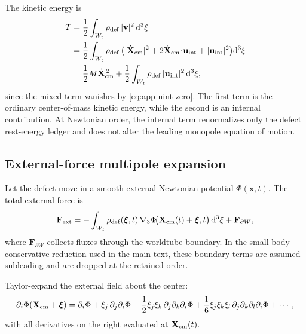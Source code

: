 \documentclass[11pt]{article}
\newcommand{\dd}{\mathrm d}
\newcommand{\x}{\mathbf x}
\newcommand{\vct}{\mathbf v}
\newcommand{\gradThree}{\nabla_3}
\newcommand{\PhiN}{\Phi}
\begin{document}
The kinetic energy is
\begin{align}
T
&=
\frac12\int_{W_t}\rho_{\rm def}\,|\vct|^2\,\dd^3\xi
\nonumber\\
&=
\frac12\int_{W_t}\rho_{\rm def}\,
\bigl(
|\dot{\mathbf X}_{\rm cm}|^2
+
2\dot{\mathbf X}_{\rm cm}\!\cdot\!\mathbf u_{\rm int}
+
|\mathbf u_{\rm int}|^2
\bigr)\dd^3\xi
\nonumber\\
&=
\frac12 M\dot{\mathbf X}_{\rm cm}^{\,2}
+
\frac12\int_{W_t}\rho_{\rm def}\,|\mathbf u_{\rm int}|^2\,\dd^3\xi,
\label{eq:app-kinetic-split}
\end{align}
since the mixed term vanishes by \eqref{eq:app-uint-zero}. The first term is the ordinary
center-of-mass kinetic energy, while the second is an internal contribution. At Newtonian
order, the internal term renormalizes only the defect rest-energy ledger and does not
alter the leading monopole equation of motion.

\subsection{External-force multipole expansion}
\label{app:moments-force}

Let the defect move in a smooth external Newtonian potential \(\PhiN(\x,t)\). The total
external force is
\begin{equation}
\mathbf F_{\rm ext}
=
-\int_{W_t}\rho_{\rm def}(\boldsymbol{\xi},t)\,
\gradThree \PhiN\!\bigl(\mathbf X_{\rm cm}(t)+\boldsymbol{\xi},t\bigr)\,\dd^3\xi
+
\mathbf F_{\partial W},
\label{eq:app-force-def}
\end{equation}
where \(\mathbf F_{\partial W}\) collects fluxes through the worldtube boundary. In the
small-body conservative reduction used in the main text, these boundary terms are assumed
subleading and are dropped at the retained order.

Taylor-expand the external field about the center:
\begin{equation}
\partial_i \PhiN(\mathbf X_{\rm cm}+\boldsymbol{\xi})
=
\partial_i\PhiN
+
\xi_j\,\partial_j\partial_i\PhiN
+
\frac12\xi_j\xi_k\,\partial_j\partial_k\partial_i\PhiN
+
\frac{1}{6}\xi_j\xi_k\xi_l\,\partial_j\partial_k\partial_l\partial_i\PhiN
+\cdots,
\label{eq:app-grad-taylor}
\end{equation}
with all derivatives on the right evaluated at \(\mathbf X_{\rm cm}(t)\).
\end{document}

